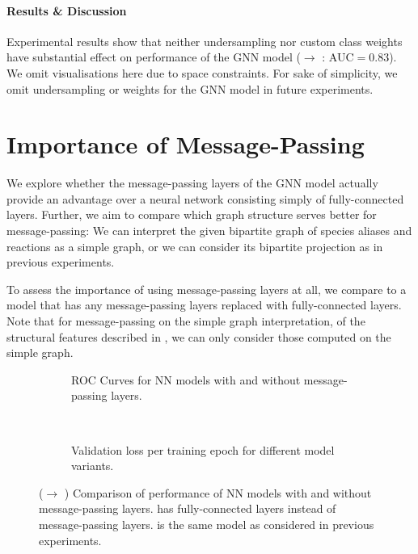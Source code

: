 \documentclass[
	fontsize=10pt, %
	twoside=true, %
	secnumdepth=1, %
  toc=indentunnumbered %
]{kaobook}
\begin{document}
\paragraph{Results \& Discussion} Experimental results show that neither
undersampling nor custom class weights have substantial effect on performance of
the GNN model (\ADLast $\rightarrow$ \PDMap: AUC$=0.83$).
We omit visualisations here due to space constraints.
For sake of simplicity, we omit undersampling or weights for the GNN model in future experiments.



\section{Importance of Message-Passing}
\label{sec:importance-message-passing}

We explore whether the message-passing layers of the GNN model actually provide
an advantage over a neural network
consisting simply of fully-connected layers. Further, we aim to compare which
graph structure serves better for message-passing: We can interpret the given
bipartite graph of species aliases and reactions as a simple graph, or we can
consider its bipartite projection as in previous experiments.

To assess the importance of using message-passing layers at all, we compare to a
model that has any message-passing layers replaced with fully-connected layers.
Note that for message-passing on the simple graph interpretation, of the
structural features described in , we can only
consider those computed on the simple graph.

\begin{figure}[h]
  \centering
  \begin{subfigure}[h]{0.48\linewidth}
    \caption{ROC Curves for NN models with and without message-passing layers.}
  \end{subfigure}
  ~~
  \begin{subfigure}[h]{0.48\linewidth}
    \caption{Validation loss per training epoch for different model variants.}
  \end{subfigure}
  \caption{(\ADLast $\rightarrow$ \PDMap) Comparison of performance of NN models
    with and without message-passing layers.  has
    fully-connected layers instead of message-passing layers.
     is the same model as considered in previous
    experiments. }
  \label{fig:importance-message-passing}
\end{figure}
\end{document}
